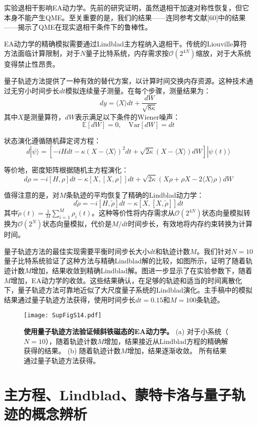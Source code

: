 \documentclass[11pt,a4paper]{article}
\begin{document}
实验退相干影响EA动力学。先前的研究证明，虽然退相干加速对称性恢复，但它本身不能产生QME。至关重要的是，我们的结果——连同参考文献[60]中的结果——揭示了QME在现实退相干条件下的鲁棒性。

EA动力学的精确模拟需要通过Lindblad主方程纳入退相干。传统的Liouville算符方法面临计算限制，对于$N$量子比特系统，内存需求按$\mathcal{O}(2^{4N})$缩放，对于大系统变得禁止性昂贵。

量子轨迹方法提供了一种有效的替代方案，以计算时间交换内存资源。这种技术通过无穷小时间步长$dt$模拟连续量子测量。在每个步骤，测量结果为：
\[
dy = \langle X\rangle dt + \frac{dW}{\sqrt{8\kappa}}
\]
其中$X$是测量算符，$dW$表示满足以下条件的Wiener噪声：
\[
\mathbb{E}[dW] = 0, \quad \text{Var}[dW] = dt
\]

状态演化遵循随机薛定谔方程：
\[
d|\psi\rangle = \left[-iHdt - \kappa(X-\langle X\rangle)^2 dt + \sqrt{2\kappa}(X-\langle X\rangle)dW\right]|\psi(t)\rangle
\]

等价地，密度矩阵根据随机主方程演化：
\[
d\rho = -i[H,\rho]dt - \kappa[X,[X,\rho]]dt + \sqrt{2\kappa}\left(X\rho + \rho X - 2\langle X\rangle\rho\right)dW
\]

值得注意的是，对$M$条轨迹的平均恢复了精确的Lindblad动力学：
\[
d\tilde{\rho} = -i[H,\tilde{\rho}]dt - \kappa[X,[X,\tilde{\rho}]]dt
\]
其中$\tilde{\rho}(t) = \frac{1}{M}\sum_{i=1}^{M}\rho_i(t)$。这种等价性将内存需求从$\mathcal{O}(2^{4N})$状态向量模拟转换为$\mathcal{O}(2^{N})$状态向量模拟，代价是$M/dt$时间步长，有效地将内存约束转换为计算时间。

量子轨迹方法的最佳实现需要平衡时间步长大小$dt$和轨迹计数$M$。我们针对$N=10$量子比特系统验证了这种方法与精确Lindblad解的比较，如图所示，证明了随着轨迹计数$M$增加，结果收敛到精确Lindblad解。图进一步显示了在实验参数下，随着$M$增加，EA动力学的收敛。这些结果确认，在足够的轨迹和适当的时间离散化下，量子轨迹方法可靠地近似了大尺度量子系统的Lindblad演化。主手稿中的模拟结果通过量子轨迹方法获得，使用时间步长$dt=0.15$和$M=100$条轨迹。

\begin{figure}[H]
    \centering
    \texttt{[image: SupFigS14.pdf]}
    \caption{
        \textbf{使用量子轨迹方法验证倾斜铁磁态的EA动力学。}
        (a) 对于小系统（$N=10$），随着轨迹计数$M$增加，结果接近从Lindblad方程的精确解获得的结果。
        (b) 随着轨迹计数$M$增加，结果逐渐收敛。
        所有结果通过量子轨迹方法获得。
    }
    \label{fig:quantum_trajectory_verification}
\end{figure}


\section{主方程、Lindblad、蒙特卡洛与量子轨迹的概念辨析}
\end{document}
